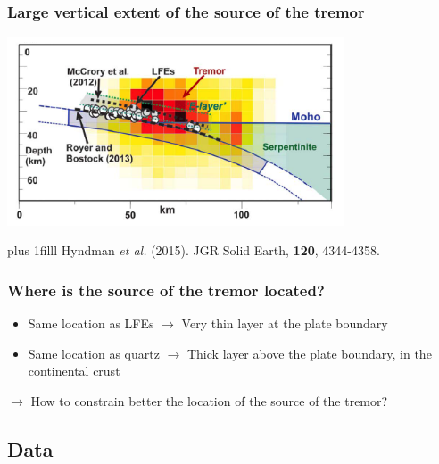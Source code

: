 \documentclass{beamer}
\newcommand{\btVFill}{\vskip0pt plus 1filll}
\begin{document}

	\begin{frame}
		\frametitle{Large vertical extent of the source of the tremor}
		\begin{center}
			\includegraphics[trim={0cm 0cm 0cm 0cm}, clip, width=10cm]{articles/hyndmann_al_2015_8b.png}
		\end{center}
		\btVFill
		\tiny{Hyndman \textit{et al.} (2015). JGR Solid Earth, \textbf{120}, 4344-4358.}
	\end{frame}

	\begin{frame}
		\frametitle{Where is the source of the tremor located?}
		\begin{itemize}
			\item Same location as LFEs $\rightarrow$ Very thin layer at the plate boundary
			\item Same location as quartz $\rightarrow$ Thick layer above the plate boundary, in the continental crust
		\end{itemize}

		\begin{block}{}
			$\rightarrow$ How to constrain better the location of the source of the tremor?
		\end{block}
	\end{frame}

	\subsection{Data}
\end{document}
